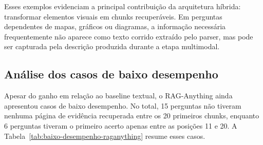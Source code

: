 \begin{table}[htbp]
\centering
\caption{Exemplos de perguntas em que o RAG-Anything recuperou evidências não encontradas pelo baseline textual.}
\label{tab:sucessos-raganything}
\scriptsize
{}
\end{table}

Esses exemplos evidenciam a principal contribuição da arquitetura híbrida: transformar elementos visuais em chunks recuperáveis. Em perguntas dependentes de mapas, gráficos ou diagramas, a informação necessária frequentemente não aparece como texto corrido extraído pelo parser, mas pode ser capturada pela descrição produzida durante a etapa multimodal.

\subsection{Análise dos casos de baixo desempenho}
\label{subsec:raganything-baixo-desempenho}

Apesar do ganho em relação ao baseline textual, o RAG-Anything ainda apresentou casos de baixo desempenho. No total, 15 perguntas não tiveram nenhuma página de evidência recuperada entre os 20 primeiros chunks, enquanto 6 perguntas tiveram o primeiro acerto apenas entre as posições 11 e 20. A Tabela~\ref{tab:baixo-desempenho-raganything} resume esses casos.

